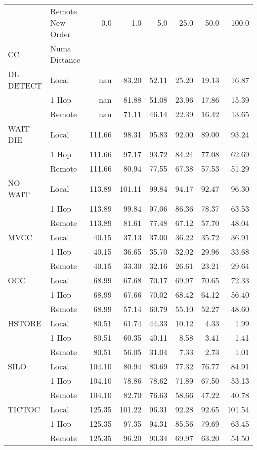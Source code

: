 \begin{tabular}{llrrrrrr}
\toprule
       & Remote New-Order &  0.0   &  1.0   &  5.0   &  25.0  &  50.0  &  100.0 \\
CC & Numa Distance &        &        &        &        &        &        \\
\midrule
DL DETECT & Local &    nan &  83.20 &  52.11 &  25.20 &  19.13 &  16.87 \\
       & 1 Hop &    nan &  81.88 &  51.08 &  23.96 &  17.86 &  15.39 \\
       & Remote &    nan &  71.11 &  46.14 &  22.39 &  16.42 &  13.65 \\
WAIT DIE & Local & 111.66 &  98.31 &  95.83 &  92.00 &  89.00 &  93.24 \\
       & 1 Hop & 111.66 &  97.17 &  93.72 &  84.24 &  77.08 &  62.69 \\
       & Remote & 111.66 &  80.94 &  77.55 &  67.38 &  57.53 &  51.29 \\
NO WAIT & Local & 113.89 & 101.11 &  99.84 &  94.17 &  92.47 &  96.30 \\
       & 1 Hop & 113.89 &  99.84 &  97.06 &  86.36 &  78.37 &  63.53 \\
       & Remote & 113.89 &  81.61 &  77.48 &  67.12 &  57.70 &  48.04 \\
MVCC & Local &  40.15 &  37.13 &  37.00 &  36.22 &  35.72 &  36.91 \\
       & 1 Hop &  40.15 &  36.65 &  35.70 &  32.02 &  29.96 &  33.68 \\
       & Remote &  40.15 &  33.30 &  32.16 &  26.61 &  23.21 &  29.64 \\
OCC & Local &  68.99 &  67.68 &  70.17 &  69.97 &  70.65 &  72.33 \\
       & 1 Hop &  68.99 &  67.66 &  70.02 &  68.42 &  64.12 &  56.40 \\
       & Remote &  68.99 &  57.14 &  60.79 &  55.10 &  52.27 &  48.60 \\
HSTORE & Local &  80.51 &  61.74 &  44.33 &  10.12 &   4.33 &   1.99 \\
       & 1 Hop &  80.51 &  60.35 &  40.11 &   8.58 &   3.41 &   1.41 \\
       & Remote &  80.51 &  56.05 &  31.04 &   7.33 &   2.73 &   1.01 \\
SILO & Local & 104.10 &  80.94 &  80.69 &  77.32 &  76.77 &  84.91 \\
       & 1 Hop & 104.10 &  78.86 &  78.62 &  71.89 &  67.50 &  53.13 \\
       & Remote & 104.10 &  82.70 &  76.63 &  58.66 &  47.22 &  40.78 \\
TICTOC & Local & 125.35 & 101.22 &  96.31 &  92.28 &  92.65 & 101.54 \\
       & 1 Hop & 125.35 &  97.35 &  94.31 &  85.56 &  79.69 &  63.45 \\
       & Remote & 125.35 &  96.20 &  90.34 &  69.97 &  63.20 &  54.50 \\
\bottomrule
\end{tabular}
